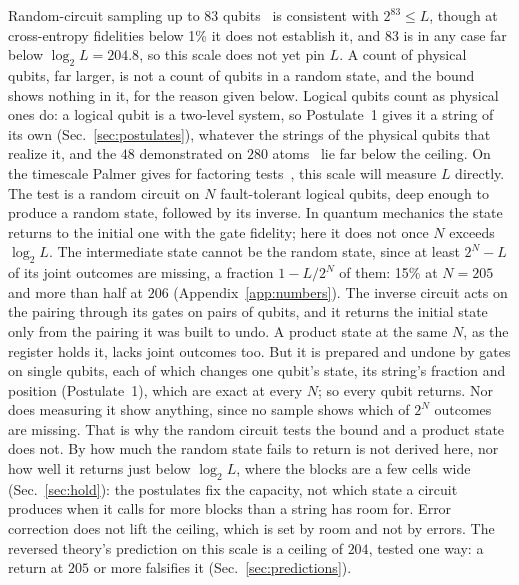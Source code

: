 \documentclass[aps,prd,twocolumn,superscriptaddress,nofootinbib,showkeys]{revtex4-2}
\makeatletter
\def\subsection{\@startsection{subsection}{2}{\z@}{0.6cm \@plus1ex \@minus .2ex}{0.35cm}{\normalfont\small\bfseries}}
\makeatother
\begin{document}
Random-circuit sampling up to $83$ qubits~\cite{gao2025} is consistent with $2^{83}\le L$, though at cross-entropy fidelities below 1\% it does not establish it, and 83 is in any case far below $\log_2L = 204.8$, so this scale does not yet pin $L$. A count of physical qubits, far larger, is not a count of qubits in a random state, and the bound shows nothing in it, for the reason given below. Logical qubits count as physical ones do: a logical qubit is a two-level system, so Postulate~1 gives it a string of its own (Sec.~\ref{sec:postulates}), whatever the strings of the physical qubits that realize it, and the $48$ demonstrated on $280$ atoms~\cite{bluvstein2024} lie far below the ceiling. On the timescale Palmer gives for factoring tests~\cite{palmer2026}, this scale will measure $L$ directly. The test is a random circuit on $N$ fault-tolerant logical qubits, deep enough to produce a random state, followed by its inverse. In quantum mechanics the state returns to the initial one with the gate fidelity; here it does not once $N$ exceeds $\log_2L$. The intermediate state cannot be the random state, since at least $2^N - L$ of its joint outcomes are missing, a fraction $1 - L/2^N$ of them: 15\% at $N = 205$ and more than half at $206$ (Appendix~\ref{app:numbers}). The inverse circuit acts on the pairing through its gates on pairs of qubits, and it returns the initial state only from the pairing it was built to undo. A product state at the same $N$, as the register holds it, lacks joint outcomes too. But it is prepared and undone by gates on single qubits, each of which changes one qubit's state, its string's fraction and position (Postulate~1), which are exact at every $N$; so every qubit returns. Nor does measuring it show anything, since no sample shows which of $2^N$ outcomes are missing. That is why the random circuit tests the bound and a product state does not. By how much the random state fails to return is not derived here, nor how well it returns just below $\log_2L$, where the blocks are a few cells wide (Sec.~\ref{sec:hold}): the postulates fix the capacity, not which state a circuit produces when it calls for more blocks than a string has room for. Error correction does not lift the ceiling, which is set by room and not by errors. The reversed theory's prediction on this scale is a ceiling of $204$, tested one way: a return at $205$ or more falsifies it (Sec.~\ref{sec:predictions}).

\subsection{Terrestrial and solar scales: the sphere}\label{sec:solar}
\end{document}
